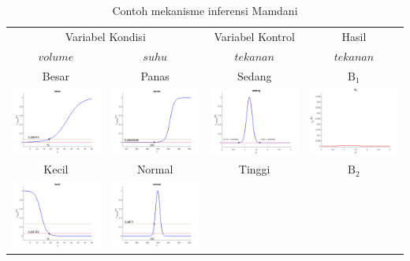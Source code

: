 \begin{contoh}
\begin{table}[t!]
    \centering
    \caption{Contoh mekanisme inferensi Mamdani}
    \label{tab:inferensi mamdani}
    \begin{tabular} {cccc}
    \toprule
    \multicolumn{2}{c}{Variabel Kondisi} & Variabel Kontrol  & Hasil\\
    \cmidrule(r){1-2}\cmidrule(lr){3-3}\cmidrule(l){4-4}
    $volume$ & $suhu$ & $tekanan$ & $tekanan$\\
    \cmidrule(r){1-1}\cmidrule(lr){2-2}\cmidrule(lr){3-3}\cmidrule(l){4-4}
    Besar & Panas & Sedang & $\text{B}_1$\\
    \includegraphics[width=3.1cm]{V_besar} & \includegraphics[width=3.1cm]{T_panas} &
    \includegraphics[width=3.1cm]{P_sedang} & \includegraphics[width=3.1cm]{B1} \\
    Kecil & Normal & Tinggi & $\text{B}_2$\\
    \includegraphics[width=3.1cm]{V_kecil} & \includegraphics[width=3.1cm]{T_normal} &

\end{tabular}
\end{table}
\end{contoh}
